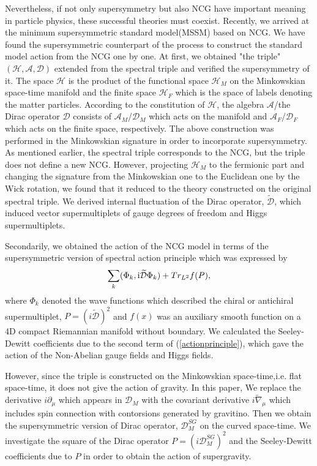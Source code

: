 \documentclass{ptephy}%
\begin{document}
Nevertheless, if not only supersymmetry but also NCG have important meaning in particle physics, 
these successful theories must coexist. Recently, we arrived at the minimum supersymmetric standard 
model(MSSM) based on NCG\cite{paper0,paper1,paper2}. We have found the supersymmetric counterpart 
of the process to construct the standard model action from the NCG one by one. 
At first, we obtained "the triple"  $(\mathcal{H},\mathcal{A},\mathcal{D})$ extended 
from the spectral triple and verified the supersymmetry of it. 
The space $\mathcal{H}$ is the product of 
the functional space $\mathcal{H}_M$ on the Minkowskian space-time manifold and the finite space  
$\mathcal{H}_F$ which is the space of labels denoting the matter particles. 
According to the constitution of $\mathcal{H}$, the algebra $\mathcal{A}$/the Dirac operator $\mathcal{D}$ 
consists of $\mathcal{A}_M$/$\mathcal{D}_M$ which acts on the manifold and $\mathcal{A}_F$/$\mathcal{D}_F$ 
which acts on the finite space, respectively. 
The above construction was performed in the Minkowskian signature in order to incorporate supersymmetry.
As mentioned earlier, the spectral triple corresponds to the NCG, but the triple does not define a new NCG. 
However, projecting $\mathcal{H}_M$ to the fermionic part and changing the signature 
from the Minkowskian one to the Euclidean one by the Wick rotation, we found that it reduced to the theory 
constructed on the original spectral triple. We derived internal fluctuation of the Dirac operator,  
$\widetilde{\mathcal{D}}$, which induced vector supermultiplets of gauge degrees of freedom and 
Higgs supermultiplets. 

Secondarily, we obtained the action of the NCG model in terms of the supersymmetric version of 
spectral action principle\cite{connes8} which was expressed by  
\begin{equation}
\sum_k(\Phi_k,{\rm i}\widetilde{\mathcal{D}} \Phi_k)+Tr_{L^2}f(P), \label{actionprinciple}
\end{equation}
where $\Phi_k$ denoted the wave functions which described the chiral or antichiral supermultiplet, 
$P=(i\tilde{\mathcal{D}})^2$ and $f(x)$ was an auxiliary smooth function on a 4D compact 
Riemannian manifold without boundary\cite{connes8}. We calculated the Seeley-Dewitt coefficients 
due to the  second term of (\ref{actionprinciple}), which gave the action of the Non-Abelian 
gauge fields and Higgs fields. 

However, since the triple is constructed on the Minkowskian space-time,i.e. 
flat space-time, it does not give the action of gravity. In this paper, 
We replace the derivative $i\partial_\mu$ which appears in $\mathcal{D}_M$ with 
the covariant derivative $i\tilde{\nabla}_\mu$ which includes spin connection 
with contorsions generated by gravitino\cite{GUSYNIN,OBUKHOV}. Then we obtain 
the supersymmetric version of Dirac operator, $\mathcal{D}_M^{SG}$ on the curved 
space-time. We investigate the square of the Dirac operator $P=(i\mathcal{D}_M^{SG})^2$ 
and the Seeley-Dewitt coefficients due to $P$ in order to obtain the action of 
supergravity. 
\end{document}
